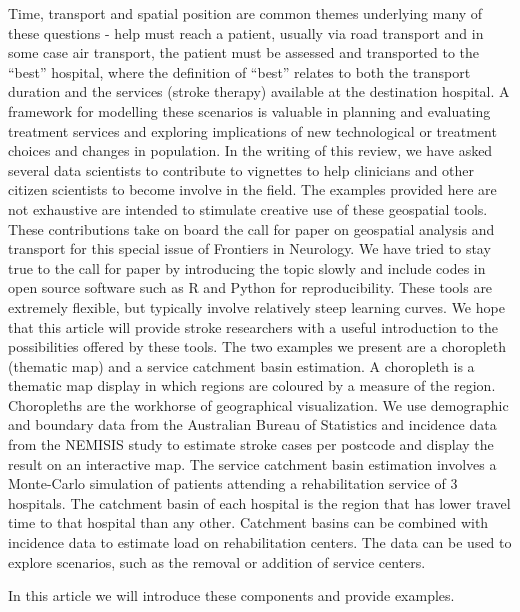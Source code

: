 \documentclass[utf8]{frontiersHLTH}
\begin{document}
Time, transport and spatial position are common themes underlying many
of these questions - help must reach a patient, usually via road
transport and in some case air transport, the patient must be assessed and transported to the
``best'' hospital, where the definition of ``best'' relates to both
the transport duration and the services (stroke therapy) available at
the destination hospital. A framework for modelling these scenarios is
valuable in planning and evaluating treatment services and exploring
implications of new technological or treatment choices and changes in
population. In the writing of this review, we have asked several data
scientists to contribute to vignettes to help clinicians and other
citizen scientists to become involve in the field. The examples provided here are not exhaustive are intended to stimulate creative use of these geospatial tools. These contributions take on board the call for paper on geospatial analysis
and transport for this special issue of Frontiers in Neurology. We have tried to stay true to the call for paper by introducing the
topic slowly and include codes in open source software such as R and
Python for reproducibility. These tools are extremely flexible, but
typically involve relatively steep learning curves. We hope that this
article will provide stroke researchers with a useful introduction to
the possibilities offered by these tools. The two examples we present
are a choropleth (thematic map) and a service catchment
basin estimation. A choropleth is a thematic map display in which regions are
coloured by a measure of the region. Choropleths are the workhorse of
geographical visualization. We use demographic and boundary data from
the Australian Bureau of Statistics and incidence data from the
NEMISIS \cite{thrift_stroke_2000,azarpazhooh2008patterns} study to
estimate stroke cases per postcode and display the result on an
interactive map. The service catchment basin estimation involves a
Monte-Carlo simulation of patients attending a rehabilitation service
of 3 hospitals. The catchment basin of each hospital is the region
that has lower travel time to that hospital than any other.  Catchment
basins can be combined with incidence data to estimate load on
rehabilitation centers. The data can be used to explore scenarios,
such as the removal or addition of service centers.

In this article we will introduce these components and provide
examples.
\end{document}
